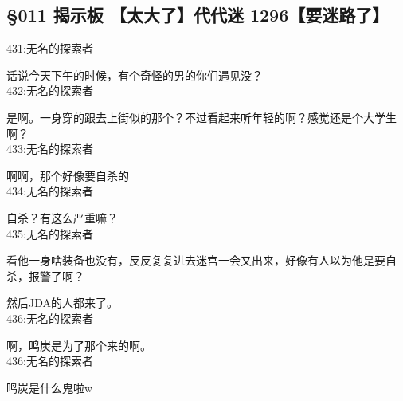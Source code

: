 \subsection{§011 揭示板 【太大了】代代迷 1296【要迷路了】}

431:无名的探索者

话说今天下午的时候，有个奇怪的男的你们遇见没？\\

432:无名的探索者

是啊。一身穿的跟去上街似的那个？不过看起来听年轻的啊？感觉还是个大学生啊？\\

433:无名的探索者

啊啊，那个好像要自杀的\\

434:无名的探索者

自杀？有这么严重嘛？\\

435:无名的探索者

看他一身啥装备也没有，反反复复进去迷宫一会又出来，好像有人以为他是要自杀，报警了啊？

然后JDA的人都来了。\\

436:无名的探索者

啊，鸣炭是为了那个来的啊。\\

436:无名的探索者

鸣炭是什么鬼啦w\\

